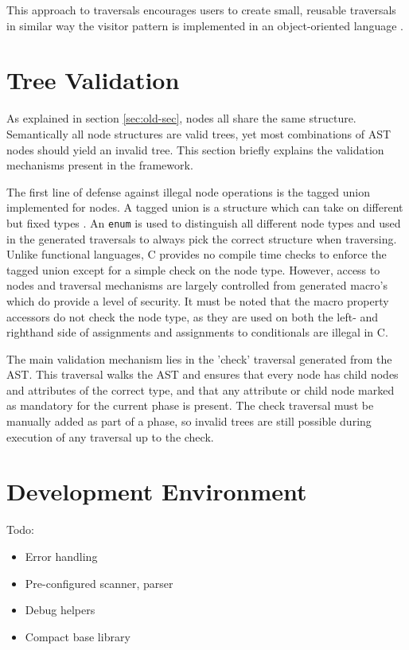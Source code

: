 \documentclass[twoside,openright]{uva-bachelor-thesis}
\newcommand{\code}[1]{\texttt{\footnotesize#1}}
\begin{document}
			This approach to traversals encourages users to create small, reusable traversals in similar way the visitor pattern is implemented in an object-oriented language \cite{gof1994}.
			
	\section{Tree Validation}\label{sec:validation}
			As explained in section \ref{sec:old-sec}, nodes all share the same structure. Semantically all node structures are valid trees, yet most combinations of AST nodes should yield an invalid tree. This section briefly explains the validation mechanisms present in the framework.
			
			The first line of defense against illegal node operations is the tagged union implemented for nodes. A tagged union is a structure which can take on different but fixed types \cite{unknown}. An \code{enum} is used to distinguish all different node types and used in the generated traversals to always pick the correct structure when traversing. Unlike  functional languages, C provides no compile time checks to enforce the tagged union except for a simple check on the node type. However, access to nodes and traversal mechanisms are largely controlled from generated macro's which do provide a level of security. It must be noted that the macro property accessors do not check the node type, as they are used on both the left- and righthand side of assignments and assignments to conditionals are illegal in C.
			
			The main validation mechanism lies in the 'check' traversal generated from the AST. This traversal walks the AST and ensures that every node has child nodes and attributes of the correct type, and that any attribute or child node marked as mandatory for the current phase is present. The check traversal must be manually added as part of a phase, so invalid trees are still possible during execution of any traversal up to the check. 
		
	\section{Development Environment}
		Todo:
		\begin{itemize}
			\item Error handling
			\item Pre-configured scanner, parser
			\item Debug helpers
			\item Compact base library
		\end{itemize}
	
\end{document}
